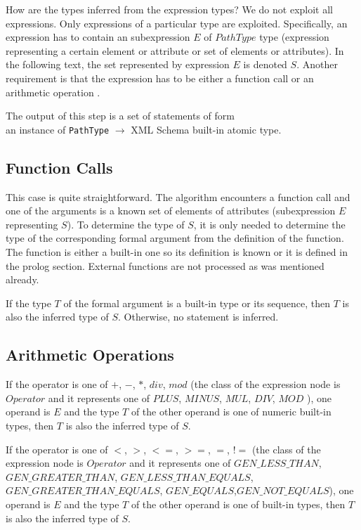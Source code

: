How are the types inferred from the expression types? We do not exploit all expressions. Only expressions of a particular type are exploited. Specifically, an expression has to contain an subexpression $E$ of $PathType$ type (expression representing a certain element or attribute or set of elements or attributes). In the following text, the set represented by expression $E$ is denoted $S$. Another requirement is that the expression has to be either a function call or an arithmetic operation .

The output of this step is a set of statements of form \\ an instance of \texttt{PathType} $\rightarrow$ XML Schema built-in atomic type.

\subsection{Function Calls}
This case is quite straightforward. The algorithm encounters a function call and one of the arguments is a known set of elements of attributes (subexpression $E$ representing $S$). To determine the type of $S$, it is only needed to determine the type of the corresponding formal argument from the definition of the function. The function is either a built-in one so its definition is known or it is defined in the prolog section. External functions are not processed as was mentioned already.

If the type $T$ of the formal argument is a built-in type or its sequence, then $T$ is also the inferred type of $S$. Otherwise, no statement is inferred.

\subsection{Arithmetic Operations}
If the operator is one of $+$, $-$, $*$, $div$, $mod$ (the class of the expression node is $Operator$ and it represents one of $PLUS$, $MINUS$, $MUL$, $DIV$, $MOD$ ), one operand is $E$ and the type $T$ of the other operand is one of numeric built-in types, then $T$ is also the inferred type of $S$.

If the operator is one of $<$, $>$, $<=$, $>=$, $=$, $!=$ (the class of the expression node is $Operator$ and it represents one of $GEN\_LESS\_THAN$, \linebreak $GEN\_GREATER\_THAN$, $GEN\_LESS\_THAN\_EQUALS$,\linebreak $GEN\_GREATER\_THAN\_EQUALS$, $GEN\_EQUALS$,\linebreak $GEN\_NOT\_EQUALS$), one operand is $E$ and the type $T$ of the other operand is one of built-in types, then $T$ is also the inferred type of $S$.

